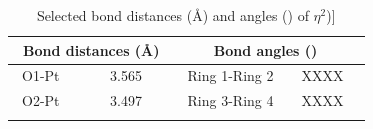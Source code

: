 \begin{table}[htp]
\caption[Selected bond distances (\AA) and angles (\degrees) of \ce{[Rh(tBu-xantphos)Cl(}$\eta^2$){]}]{Selected bond distances (\AA) and angles (\degrees) of \ce{[Rh(tBu-xantphos)Cl(}$\eta^2$)]}
\vspace{1em}
\label{crystal:rhodium:lengths}
\small
\begin{center}
\begin{tabular}{l l l l}
	\toprule
	\multicolumn{2}{l}{\bfseries{~Bond distances (\si{\angstrom})}} & \multicolumn{2}{c}{\bfseries{Bond angles (\degrees)}} \\
	\midrule		
	~O1-Pt		~~&~~3.565~~	&~~Ring 1-Ring 2		&~~XXXX~~		\\
	~O2-Pt		~~&~~3.497~~	&~~Ring 3-Ring 4		&~~XXXX~~		\\
	\bottomrule{}
\end{tabular}
\end{center}
\end{table}

